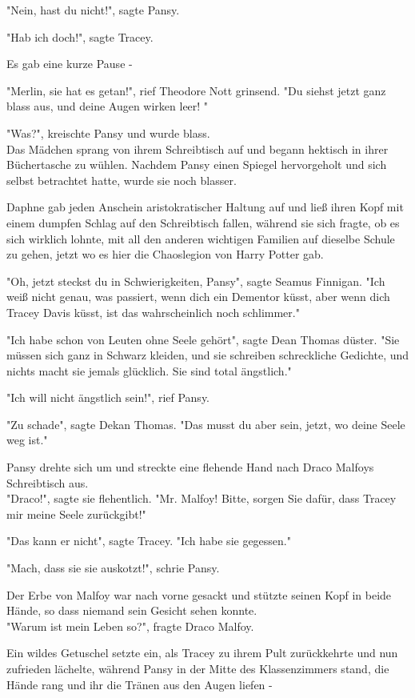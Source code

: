 {"Nein, hast du nicht!", sagte Pansy.

"Hab ich doch!", sagte Tracey.

Es gab eine kurze Pause -

"Merlin, sie hat es getan!", rief Theodore Nott grinsend. "Du siehst jetzt ganz blass aus, und deine Augen wirken leer! "

"Was?", kreischte Pansy und wurde blass.\\ Das Mädchen sprang von ihrem Schreibtisch auf und begann hektisch in ihrer Büchertasche zu wühlen. Nachdem Pansy einen Spiegel hervorgeholt und sich selbst betrachtet hatte, wurde sie noch blasser.

Daphne gab jeden Anschein aristokratischer Haltung auf und ließ ihren Kopf mit einem dumpfen Schlag auf den Schreibtisch fallen, während sie sich fragte, ob es sich wirklich lohnte, mit all den anderen wichtigen Familien auf dieselbe Schule zu gehen, jetzt wo es hier die Chaoslegion von Harry Potter gab.

"Oh, jetzt steckst du in Schwierigkeiten, Pansy", sagte Seamus Finnigan. "Ich weiß nicht genau, was passiert, wenn dich ein Dementor küsst, aber wenn dich Tracey Davis küsst, ist das wahrscheinlich noch schlimmer."

"Ich habe schon von Leuten ohne Seele gehört", sagte Dean Thomas düster. "Sie müssen sich ganz in Schwarz kleiden, und sie schreiben schreckliche Gedichte, und nichts macht sie jemals glücklich. Sie sind total ängstlich."

"Ich will nicht ängstlich sein!", rief Pansy.

"Zu schade", sagte Dekan Thomas. "Das musst du aber sein, jetzt, wo deine Seele weg ist."

Pansy drehte sich um und streckte eine flehende Hand nach Draco Malfoys Schreibtisch aus.\\ "Draco!", sagte sie flehentlich. "Mr. Malfoy! Bitte, sorgen Sie dafür, dass Tracey mir meine Seele zurückgibt!"

"Das kann er nicht", sagte Tracey. "Ich habe sie gegessen."

"Mach, dass sie sie auskotzt!", schrie Pansy.

Der Erbe von Malfoy war nach vorne gesackt und stützte seinen Kopf in beide Hände, so dass niemand sein Gesicht sehen konnte.\\ "Warum ist mein Leben so?", fragte Draco Malfoy.

Ein wildes Getuschel setzte ein, als Tracey zu ihrem Pult zurückkehrte und nun zufrieden lächelte, während Pansy in der Mitte des Klassenzimmers stand, die Hände rang und ihr die Tränen aus den Augen liefen -

}
